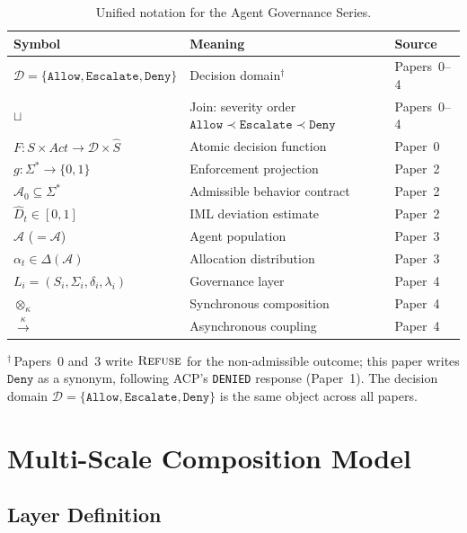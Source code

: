 \documentclass[11pt]{article}
\newcommand{\Agents}{\mathcal{A}}
\newcommand{\Dec}{\mathcal{D}}
\newcommand{\Dhat}{\widehat{D}}
\newcommand{\Azero}{\mathcal{A}_0}
\newcommand{\allow}{\texttt{Allow}}
\newcommand{\deny}{\texttt{Deny}}
\newcommand{\escalate}{\texttt{Escalate}}
\newcommand{\join}{\sqcup}
\begin{document}
\begin{table}[ht]
\centering\small
\caption{Unified notation for the Agent Governance Series.}
\label{tab:notation}
\begin{tabular}{lp{5.8cm}l}
\toprule
\textbf{Symbol} & \textbf{Meaning} & \textbf{Source} \\
\midrule
$\Dec = \{\allow,\escalate,\deny\}$ & Decision domain$^{\dagger}$ & Papers~0--4 \\
$\join$ & Join: severity order $\allow \prec \escalate \prec \deny$ & Papers~0--4 \\
$F: S \times \mathit{Act} \to \Dec \times \hat{S}$ & Atomic decision function & Paper~0 \\
$g: \Sigma^* \to \{0,1\}$ & Enforcement projection & Paper~2 \\
$\Azero \subseteq \Sigma^*$ & Admissible behavior contract & Paper~2 \\
$\Dhat_t \in [0,1]$ & IML deviation estimate & Paper~2 \\
$\Agents$ ($= \mathcal{A}$) & Agent population & Paper~3 \\
$\alpha_t \in \Delta(\Agents)$ & Allocation distribution & Paper~3 \\
$L_i = (S_i, \Sigma_i, \delta_i, \lambda_i)$ & Governance layer & Paper~4 \\
$\otimes_\kappa$ & Synchronous composition & Paper~4 \\
$\xrightarrow{\kappa}$ & Asynchronous coupling & Paper~4 \\
\bottomrule
\end{tabular}
\smallskip

\noindent\small $^{\dagger}$\,Papers~0 and~3 write $\textsc{Refuse}$ for the
non-admissible outcome; this paper writes $\deny$ as a synonym, following
ACP's \texttt{DENIED} response (Paper~1).  The decision domain
$\Dec = \{\allow,\escalate,\deny\}$ is the same object across all papers.
\end{table}

\section{Multi-Scale Composition Model}
\label{sec:model}

\subsection{Layer Definition}
\end{document}
